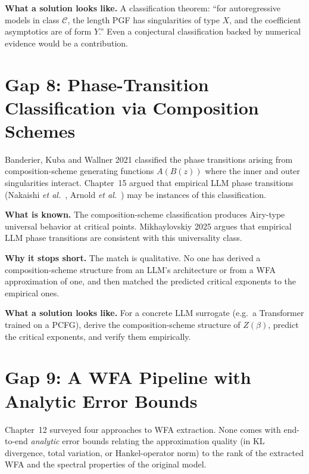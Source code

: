 \textbf{What a solution looks like.} A classification theorem: ``for autoregressive models in class $\mathcal{C}$, the length PGF has singularities of type $X$, and the coefficient asymptotics are of form $Y$.'' Even a conjectural classification backed by numerical evidence would be a contribution.

\section{Gap 8: Phase-Transition Classification via Composition Schemes}
\label{ch18:gap8}

Banderier, Kuba and Wallner 2021 \cite{BanderierKubaWallner2021} classified the phase transitions arising from composition-scheme generating functions $A(B(z))$ where the inner and outer singularities interact. Chapter~15 argued that empirical LLM phase transitions (Nakaishi \emph{et al.}\ \cite{NakaishiNishikawaHukushima2024}, Arnold \emph{et al.}\ \cite{ArnoldEtAl2024}) may be instances of this classification.

\textbf{What is known.} The composition-scheme classification produces Airy-type universal behavior at critical points. Mikhaylovskiy 2025 \cite{Mikhaylovskiy2025} argues that empirical LLM phase transitions are consistent with this universality class.

\textbf{Why it stops short.} The match is qualitative. No one has derived a composition-scheme structure from an LLM's architecture or from a WFA approximation of one, and then matched the predicted critical exponents to the empirical ones.

\textbf{What a solution looks like.} For a concrete LLM surrogate (e.g.\ a Transformer trained on a PCFG), derive the composition-scheme structure of $Z(\beta)$, predict the critical exponents, and verify them empirically.

\section{Gap 9: A WFA Pipeline with Analytic Error Bounds}
\label{ch18:gap9}

Chapter~12 surveyed four approaches to WFA extraction. None comes with end-to-end \emph{analytic} error bounds relating the approximation quality (in KL divergence, total variation, or Hankel-operator norm) to the rank of the extracted WFA and the spectral properties of the original model.

